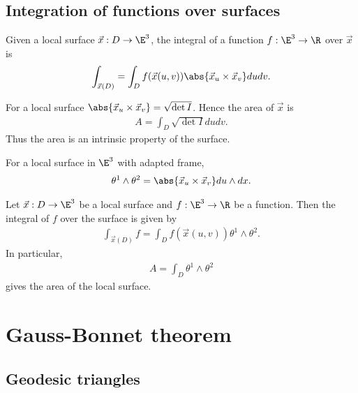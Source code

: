 \documentclass{article}
\begin{document}
\subsection{Integration of functions over surfaces}

\begin{definition}
    Given a local surface $\vec x:D\to\E^3$, the integral of a 
    function $f:\E^3\to\R$ over $\vec x$ is 
    \begin{align*}
        \int_{\vec x(D)} = \int_D f(\vec x(u,v))\abs{\vec x_u \times \vec x_v}dudv.
    \end{align*}
\end{definition}

\begin{lemma}
    For a local surface $\abs{\vec x_u \times \vec x_v}=\sqrt{\det I}$. Hence the area 
    of $\vec x$ is 
    \begin{align*}
        A = \int_D \sqrt{\det I}dudv.
    \end{align*}
    Thus the area is an intrinsic property of the surface.
\end{lemma}

\begin{lemma}
    For a local surface in $\E^3$ with adapted frame,
    \begin{align*}
        \theta^1\wedge\theta^2 = \abs{\vec x_u \times \vec x_v} du \wedge dx.
    \end{align*}
\end{lemma}

\begin{corollary}
    Let $\vec x: D\to\E^3$ be a local surface and $f:\E^3\to\R$ be a function. Then 
    the integral of $f$ over the surface is given by 
    \begin{align*}
        \int_{\vec x(D)} f = \int_D f(\vec x(u,v))\theta^1\wedge\theta^2.
    \end{align*}
    In particular, 
    \begin{align*}
        A = \int_D \theta^1\wedge\theta^2
    \end{align*}
    gives the area of the local surface. 
\end{corollary}

\section{Gauss-Bonnet theorem}

\subsection{Geodesic triangles}
\end{document}
